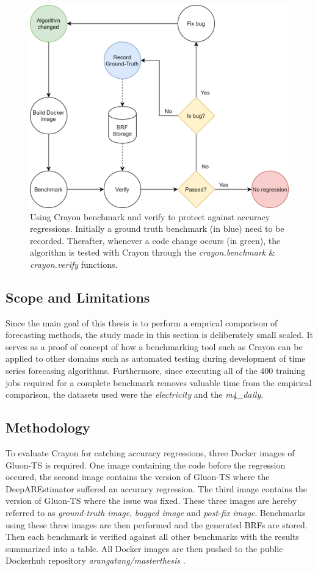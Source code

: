 \begin{figure}[h]
  \centering
  \includegraphics[width=\linewidth]{./img/crayon_for_regression_testing.png}
  \caption{Using Crayon benchmark and verify to protect against accuracy regressions. Initially a ground truth benchmark (in blue) need to be recorded. Therafter, whenever a code change occurs (in green), the algorithm is tested with Crayon through the \textit{crayon.benchmark} \& \textit{crayon.verify} functions.}
  \label{fig:crayon_as_test}
\end{figure}

\subsection{Scope and Limitations}
Since the main goal of this thesis is to perform a emprical comparison of forecasting methods, the study made in this section is deliberately small scaled. It serves as a proof of concept of how a benchmarking tool such as Crayon can be applied to other domains such as automated testing during development of time series forecasing algorithms. Furthermore, since executing all of the 400 training jobs required for a complete benchmark removes valuable time from the empirical comparison, the datasets used were the \textit{electricity} and the \textit{m4\_daily}.

\subsection{Methodology}
To evaluate Crayon for catching accuracy regressions, three Docker images of Gluon-TS is required. One image containing the code before the regression occured, the second image contains the version of Gluon-TS where the DeepAREstimator suffered an accuracy regression. The third image contains the version of Gluon-TS where the issue was fixed. These three images are hereby referred to as \textit{ground-truth image}, \textit{bugged image} and \textit{post-fix image}. Benchmarks using these three images are then performed and the generated BRFs are stored. Then each benchmark is verified against all other benchmarks with the results summarized into a table. All Docker images are then pushed to the public Dockerhub repository \textit{arangatang/masterthesis} \cite{dockerhub_arangatang}.


